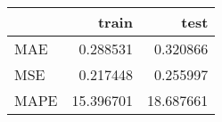 \begin{tabular}{lrr}
\toprule
{} &      train &       test \\
\midrule
MAE  &   0.288531 &   0.320866 \\
MSE  &   0.217448 &   0.255997 \\
MAPE &  15.396701 &  18.687661 \\
\bottomrule
\end{tabular}

